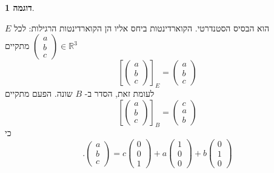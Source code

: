 \documentclass[12pt]{report}
\theoremstyle{plain}
\theoremstyle{definition}
\newtheorem{example}{דוגמה}[chapter]
\newcommand{\R}{\mathbb{R}}
\newcommand{\0}{\mathbf{0}}
\begin{document}
\begin{example}
\begin{enumerate}[label=\alph*.]
$E$
הוא הבסיס הסטנדרטי. הקוארדינטות ביחס אליו הן הקוארדינטות הרגילות: לכל
$\begin{pmatrix}a\\b\\c\end{pmatrix}\in\R^3$
מתקיים
$$
\left[\begin{pmatrix}
a \\
b \\
c
\end{pmatrix}\right]_E=\begin{pmatrix}
a \\
b \\
c
\end{pmatrix}
$$
לעומת זאת, הסדר ב-
$B$
שונה. הפעם מתקיים
$$
\left[\begin{pmatrix}
a \\
b \\
c
\end{pmatrix}\right]_B=\begin{pmatrix}
c \\
a \\
b
\end{pmatrix}
$$
כי
$$
.\begin{pmatrix}
a \\
b \\
c
\end{pmatrix}=c\begin{pmatrix}
0 \\
0 \\
1
\end{pmatrix}+a\begin{pmatrix}
1 \\
0 \\
0
\end{pmatrix}+b\begin{pmatrix}
0 \\
1 \\
0
\end{pmatrix}
$$



\end{enumerate}
\end{example}
\end{document}
